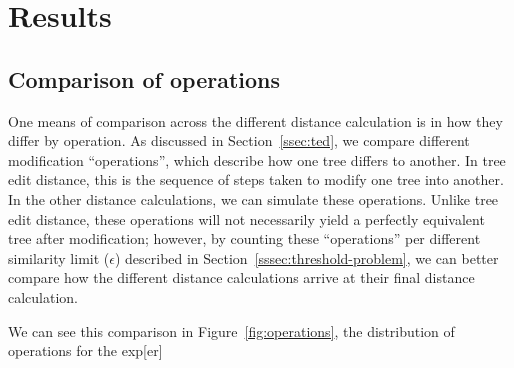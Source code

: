 \section{Results}
\label{sec:results}






\subsection{Comparison of operations}

One means of comparison across the different distance calculation is in how they differ by operation. As discussed in Section~\ref{ssec:ted}, we compare different modification ``operations'', which describe how one tree differs to another. In tree edit distance, this is the sequence of steps taken to modify one tree into another. In the other distance calculations, we can simulate these operations. Unlike tree edit distance, these operations will not necessarily yield a perfectly equivalent tree after modification; however, by counting these ``operations'' per different similarity limit ($\epsilon$) described in Section~\ref{sssec:threshold-problem}, we can better compare how the different distance calculations arrive at their final distance calculation.

We can see this comparison in Figure~\ref{fig:operations}, the distribution of operations for the exp[er]

